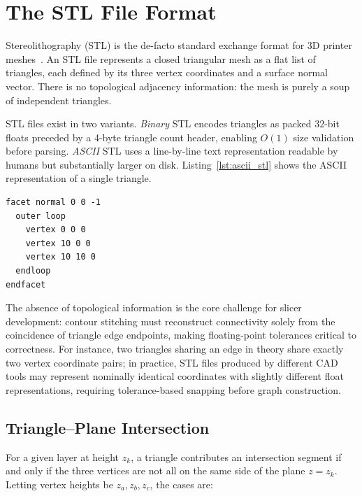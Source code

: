 \documentclass[10pt,twocolumn,a4paper]{article}
\begin{document}
\section{The STL File Format}
\label{sec:stl}

Stereolithography (STL) is the de-facto standard exchange format
for 3D printer meshes~\cite{gibson2021additive}.
An STL file represents a closed triangular mesh as a flat list
of triangles, each defined by its three vertex coordinates
and a surface normal vector. There is no topological adjacency
information: the mesh is purely a soup of independent triangles.

STL files exist in two variants. \emph{Binary} STL encodes
triangles as packed 32-bit floats preceded by a 4-byte triangle
count header, enabling $O(1)$ size validation before parsing.
\emph{ASCII} STL uses a line-by-line text representation readable
by humans but substantially larger on disk.
Listing~\ref{lst:ascii_stl} shows the ASCII representation
of a single triangle.

\begin{lstlisting}[caption={ASCII STL representation of one triangle.},
                   label={lst:ascii_stl}, language={}]
facet normal 0 0 -1
  outer loop
    vertex 0 0 0
    vertex 10 0 0
    vertex 10 10 0
  endloop
endfacet
\end{lstlisting}

The absence of topological information is the core challenge
for slicer development: contour stitching must reconstruct
connectivity solely from the coincidence of triangle edge endpoints,
making floating-point tolerances critical to correctness.
For instance, two triangles sharing an edge in theory share
exactly two vertex coordinate pairs; in practice, STL files
produced by different CAD tools may represent nominally identical
coordinates with slightly different float representations,
requiring tolerance-based snapping before graph construction.

\subsection*{Triangle–Plane Intersection}

For a given layer at height $z_k$, a triangle contributes an
intersection segment if and only if the three vertices are not all
on the same side of the plane $z = z_k$.
Letting vertex heights be $z_a, z_b, z_c$, the cases are:
\end{document}
